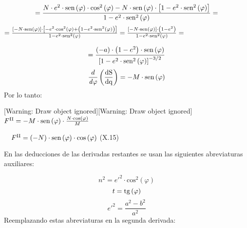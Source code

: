 \documentclass{tufte-book}
\newcommand\normalsubformula[1]{\text{\mathversion{normal}$#1$}}
\begin{document}
\begin{equation*}
{=\frac{N\cdot e^{{2}}\cdot \normalsubformula{\text{sen}}\left(\varphi
\right)\cdot \text{cos}^{{2}}\left(\varphi \right)-N\cdot
\normalsubformula{\text{sen}}\left(\varphi \right)\cdot
\left[1-e^{{2}}\cdot \normalsubformula{\text{sen}}^{{2}}\left(\varphi
\right)\right]}{1-e^{{2}}\cdot
\normalsubformula{\text{sen}}^{{2}}\left(\varphi \right)}=}
\end{equation*}
 ${=\frac{\left[-N\cdot \normalsubformula{\text{sen}}\left(\varphi
\right)\right]\cdot \left[-e^{{2}}\cdot \text{cos}^{{2}}\left(\varphi
\right)+\left(1-e^{{2}}\cdot
\normalsubformula{\text{sen}}^{{2}}\left(\varphi
\right)\right)\right]}{1-e^{{2}}\cdot
\normalsubformula{\text{sen}}^{{2}}\left(\varphi
\right)}=\frac{\left[-N\cdot \normalsubformula{\text{sen}}\left(\varphi
\right)\right]\cdot \left(1-e^{{2}}\right)}{1-e^{{2}}\cdot
\normalsubformula{\text{sen}}^{{2}}\left(\varphi \right)}=}$

\begin{equation*}
{=\frac{\left(-a\right)\cdot \left(1-e^{{2}}\right)\cdot
\normalsubformula{\text{sen}}\left(\varphi
\right)}{\left[1-e^{{2}}\cdot
\normalsubformula{\text{sen}}^{{2}}\left(\varphi
\right)\right]^{{-3/2}}}}
\end{equation*}
\begin{equation*}
{\frac{d}{\mathit{d\varphi
}}\left(\frac{\normalsubformula{\text{dS}}}{\normalsubformula{\text{dq}}}\right)=-M\cdot
\normalsubformula{\text{sen}}\left(\varphi \right)}
\end{equation*}
Por lo tanto:

[Warning: Draw object ignored][Warning: Draw object ignored]\ \ 
${F^{{\normalsubformula{\text{II}}}}=-M\cdot
\normalsubformula{\text{sen}}\left(\varphi \right)\cdot {\frac{N\cdot
\text{cos}\left(\varphi \right)}{M}}}$

\ \  ${F^{{\normalsubformula{\text{II}}}}=\left(-N\right)\cdot
\normalsubformula{\text{sen}}\left(\varphi \right)\cdot
\text{cos}\left(\varphi \right)}$  (X.15)

En las deducciones de las derivadas restantes se usan las siguientes
abreviaturas auxiliares:

\begin{equation*}
{n^{{2}}=e'^{{2}}\cdot \text{cos}^{{2}}\left(\varphi \right)}
\end{equation*}
\begin{equation*}
{t=\normalsubformula{\text{tg}}\left(\varphi \right)}
\end{equation*}
\begin{equation*}
{e'^{{2}}=\frac{a^{{2}}-b^{{2}}}{a^{{2}}}}
\end{equation*}
Reemplazando estas abreviaturas en la segunda derivada:
\end{document}
